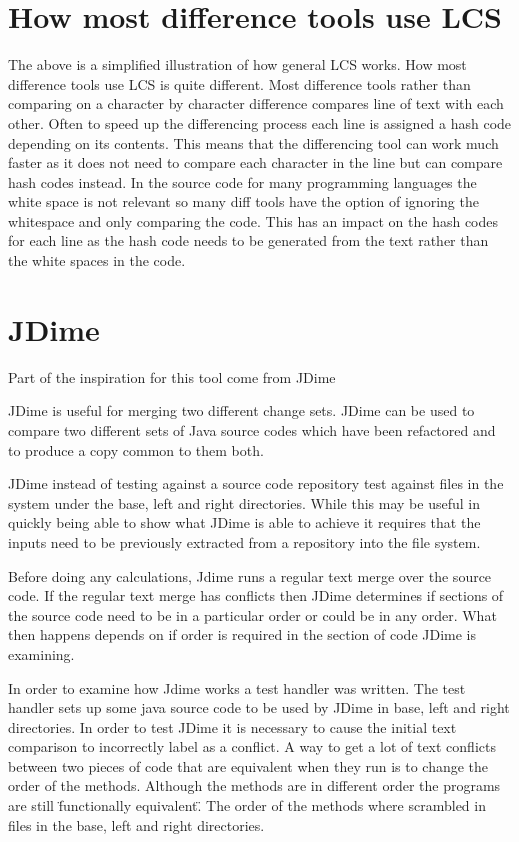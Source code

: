 \section{How most difference tools use LCS}
The above is a simplified illustration of how general LCS works.
How most difference tools use LCS is quite different.
Most difference tools rather than comparing on a character by character difference compares line of text with each other.
Often to speed up the differencing process each line is assigned a hash code depending on its contents. 
This means that the differencing tool can work much faster as it does not need to compare each character in the line but can compare hash codes instead.
In the source code for many programming languages the white space is not relevant so many diff tools have the option of ignoring the whitespace and only comparing the code.
This has an impact on the hash codes for each line as the hash code needs to be generated from the text rather than the white spaces in the code.
% 
 
 



\section{JDime}
Part of the inspiration for this tool come from JDime



JDime is useful for merging two different change sets. 
JDime can be used to compare two different sets of Java source codes which have been refactored and to produce a copy common to them both.  

JDime instead of testing against a source code repository test against files in the system under the base, left and right directories.
While this may be useful in quickly being able to show what JDime is able to achieve it requires that the inputs need to be previously extracted from a repository into the file system.

Before doing any calculations, Jdime runs a regular text merge over the source code.  
If the regular text merge has conflicts then JDime determines if sections of the source code need to be in a particular order or could be in any order.
What then happens depends on if order is required in the section of code JDime is examining.

In order to examine how Jdime works a test handler was written.
The test handler sets up some java source code to be used by JDime in base, left and right directories.
In order to test JDime it is necessary to cause the initial text comparison to incorrectly label as a conflict.
A way to get a lot of text conflicts between two pieces of code that are equivalent when they run is to change the order of the methods.
Although the methods are in different order the programs are still \"functionally equivalent\".
The order of the methods where scrambled in files in the base, left and right directories.





 







 
 


